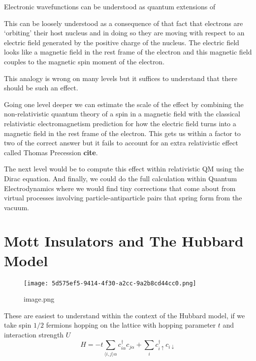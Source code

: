 Electronic wavefunctions can be understood as quantum extensions of

This can be loosely understood as a consequence of that fact that electrons are `orbiting' their host nucleus and in doing so they are moving with respect to an electric field generated by the positive charge of the nucleus. The electric field looks like a magnetic field in the rest frame of the electron and this magnetic field couples to the magnetic spin moment of the electron.

This analogy is wrong on many levels but it suffices to understand that there should be such an effect.

Going one level deeper we can estimate the scale of the effect by combining the non-relativistic quantum theory of a spin in a magnetic field with the classical relativistic electromagnetism prediction for how the electric field turns into a magnetic field in the rest frame of the electron. This gets us within a factor to two of the correct answer but it fails to account for an extra relativistic effect called Thomas Precession \textbf{cite}.

The next level would be to compute this effect within relativistic QM using the Dirac equation. And finally, we could do the full calculation within Quantum Electrodynamics where we would find tiny corrections that come about from virtual processes involving particle-antiparticle pairs that spring form from the vacuum.

\hypertarget{mott-insulators-and-the-hubbard-model}{%
\section{Mott Insulators and The Hubbard Model}\label{mott-insulators-and-the-hubbard-model}}

\begin{fignos:no-prefix-figure-caption}

\begin{figure}
\centering
\texttt{[image: 5d575ef5-9414-4f30-a2cc-9a2b8cd44cc0.png]}
\caption{image.png}
\end{figure}

\end{fignos:no-prefix-figure-caption}

These are easiest to understand within the context of the Hubbard model, if we take spin \(1/2\) fermions hopping on the lattice with hopping parameter \(t\) and interaction strength \(U\) \[ H = -t \sum_{\langle i,j \rangle \alpha} c^\dagger_{i\alpha} c_{j\alpha} + \sum_i c^\dagger_{i\uparrow} c_{i\downarrow}\]


